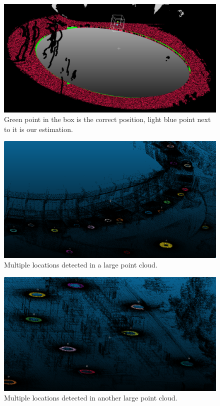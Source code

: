 \begin{figure}[h]
  \centering
  \includegraphics[scale=0.4]{img/ellipse-result.png}
  \caption{Green point in the box is the correct position, light blue point next to it is our estimation.}
  \label{fig:ellipse-result}
\end{figure}
\begin{figure}[h]
  \centering
  \includegraphics[scale=0.3]{img/ellipse-multi1.png}
  \caption{Multiple locations detected in a large point cloud.}
  \label{fig:ellipse-multi1}
\end{figure}
\begin{figure}[h]
  \centering
  \includegraphics[scale=0.3]{img/ellipse-multi2.png}
  \caption{Multiple locations detected in another large point cloud.}
  \label{fig:ellipse-multi2}
\end{figure}

